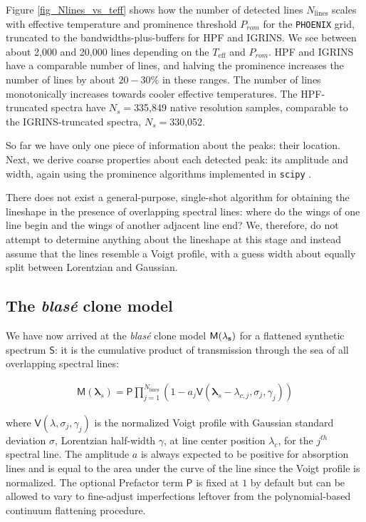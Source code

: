 \documentclass[modern]{aastex631}
\begin{document}
Figure \ref{fig_Nlines_vs_teff} shows how the number of detected lines $N_{\mathrm{lines}}$ scales with effective temperature and prominence threshold $P_{rom}$ for the \texttt{PHOENIX} grid, truncated to the bandwidths-plus-buffers for HPF and IGRINS. We see between about 2,000 and 20,000 lines depending on the $T_{\mathrm{eff}}$ and $P_{rom}$. HPF and IGRINS have a comparable number of lines, and halving the prominence increases the number of lines by about $20-30\%$ in these ranges. The number of lines monotonically increases towards cooler effective temperatures.
The HPF-truncated spectra have $N_s=$335,849 native resolution samples, comparable to the IGRINS-truncated spectra, $N_s=$330,052.

So far we have only one piece of information about the peaks: their location. Next, we derive coarse properties about each detected peak: its amplitude and width, again using the prominence algorithms implemented in \texttt{scipy} \citep{2020SciPy-NMeth}.

There does not exist a general-purpose, single-shot algorithm for obtaining the lineshape in the presence of overlapping spectral lines: where do the wings of one line begin and the wings of another adjacent line end? We, therefore, do not attempt to determine anything about the lineshape at this stage and instead assume that the lines resemble a Voigt profile, with a guess width about equally split between Lorentzian and Gaussian.

\subsection{The \emph{blas\'e} clone model}

We have now arrived at the \emph{blas\'e} clone model $\mathsf{M}(\bf{\lambda}_s)$ for a flattened synthetic spectrum $\mathsf{S}$: it is the cumulative product of transmission through the sea of all overlapping spectral lines:

\begin{eqnarray}
    \mathsf{M}(\bm{\lambda}_s) = {\displaystyle \mathsf{P} \prod_{j=1}^{N_{\mathrm{lines}}} (1-a_j \mathsf{V}(\bm{\lambda}_s-\lambda_{c,j}, \sigma_j, \gamma_j) )} \label{equation1}
\end{eqnarray}

where $\mathsf{V}(\lambda, \sigma_j, \gamma_j)$ is the normalized Voigt profile with Gaussian standard deviation $\sigma$, Lorentzian half-width $\gamma$, at line center position $\lambda_c$, for the $j^{th}$ spectral line. The amplitude $a$ is always expected to be positive for absorption lines and is equal to the area under the curve of the line since the Voigt profile is normalized. The optional Prefactor term $\mathsf{P}$ is fixed at $1$ by default but can be allowed to vary to fine-adjust imperfections leftover from the polynomial-based continuum flattening procedure.
\end{document}
